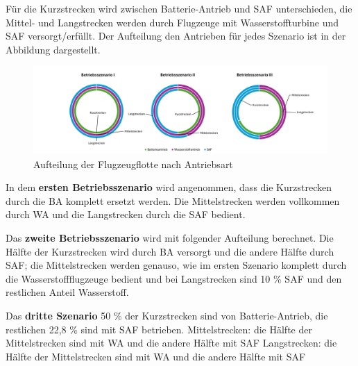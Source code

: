 Für die Kurzstrecken wird zwischen Batterie-Antrieb und SAF unterschieden, 
die Mittel- und Langstrecken werden durch Flugzeuge mit Wasserstoffturbine und SAF versorgt/erfüllt.
Der Aufteilung den Antrieben für jedes Szenario ist in der Abbildung \cite{betriebsszenarien} dargestellt.

\begin{figure}[h]
	\centering
	\includegraphics[width=1.0\linewidth]{Bilder/Betriebsszenarien.png}
	\caption[Betriebsszenarien]{Aufteilung der Flugzeugflotte nach Antriebsart}
	\label{betriebsszenarien}
\end{figure}

In dem \textbf{ersten Betriebsszenario} wird angenommen, dass die Kurzstrecken durch die BA komplett ersetzt werden.
Die Mittelstrecken werden vollkommen durch WA und die Langstrecken durch die SAF bedient.

Das \textbf{zweite Betriebsszenario} wird mit folgender Aufteilung berechnet. 
Die Hälfte der Kurzstrecken wird durch BA versorgt und die andere Hälfte durch SAF; 
die Mittelstrecken werden genauso, wie im ersten Szenario komplett durch die Wasserstoffflugzeuge bedient und 
bei Langstrecken sind 10 \% SAF und den restlichen Anteil Wasserstoff.

Das \textbf{dritte Szenario} 50 \% der Kurzstrecken sind von Batterie-Antrieb, die restlichen 22,8 \% sind mit SAF betrieben.
Mittelstrecken: die Hälfte der Mittelstrecken sind mit WA und die andere Hälfte mit SAF
Langstrecken: die Hälfte der Mittelstrecken sind mit WA und die andere Hälfte mit SAF

